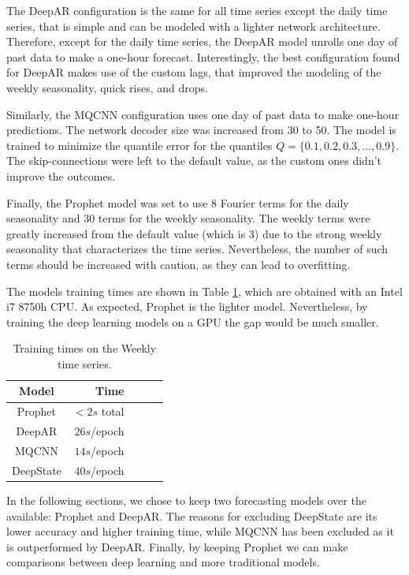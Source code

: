 \documentclass[a4paper, 12pt]{article} %
\newcommand{\ra}[1]{\renewcommand{\arraystretch}{#1}}
\begin{document}
	The DeepAR configuration is the same for all time series except the daily time series, that is simple and can be modeled with a lighter network architecture. Therefore, except for the daily time series, the DeepAR model unrolls one day of past data to make a one-hour forecast. Interestingly, the best configuration found for DeepAR makes use of the custom lags, that improved the modeling of the weekly seasonality, quick rises, and drops. 
	
	Similarly, the MQCNN configuration uses one day of past data to make one-hour predictions. The network decoder size was increased from 30 to 50. The model is trained to minimize the quantile error for the quantiles $Q = \{ 0.1, 0.2, 0.3, ..., 0.9\}$. The skip-connections were left to the default value, as the custom ones didn't improve the outcomes.
	
	Finally, the Prophet model was set to use 8 Fourier terms for the daily seasonality and 30 terms for the weekly seasonality. The weekly terms were greatly increased from the default value (which is 3) due to the strong weekly seasonality that characterizes the time series. Nevertheless, the number of such terms should be increased with caution, as they can lead to overfitting.
	
	The models training times are shown in Table \ref{table:results_forecasting_training_times}, which are obtained with an Intel i7 8750h CPU. As expected, Prophet is the lighter model. Nevertheless, by training the deep learning models on a GPU the gap would be much smaller.
	
	\begin{table}\centering 
		\ra{1.3}
	\begin{tabular}{@{}crcrc@{}} 
		\midrule
		Model & Time\\
		\midrule
		Prophet & $<2s$ total\\
		DeepAR & $26s$/epoch\\
		MQCNN & $14s$/epoch\\
		DeepState & $40s$/epoch\\
		\bottomrule
	\end{tabular}
	\caption{Training times on the Weekly time series. } \label{table:results_forecasting_training_times}
\end{table}
	
	
	In the following sections, we chose to keep two forecasting models over the available: Prophet and DeepAR. The reasons for excluding DeepState are its lower accuracy and higher training time, while MQCNN has been excluded as it is outperformed by DeepAR. Finally, by keeping Prophet we can make comparisons between deep learning and more traditional models.	
	
\end{document}
